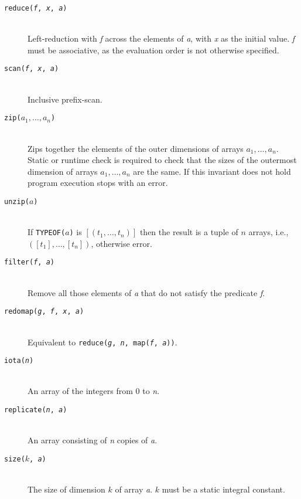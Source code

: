 \documentclass[oneside]{memoir}
\begin{document}
\begin{description}
  \item[\texttt{reduce(\textit{f}, \textit{x}, \textit{a})}]\hfill\\
    Left-reduction with \textit{f} across the elements of \textit{a},
    with \textit{x} as the initial value.  \textit{f} must be
    associative, as the evaluation order is not otherwise specified.

  \item[\texttt{scan(\textit{f}, \textit{x}, \textit{a})}]\hfill\\
    Inclusive prefix-scan.

  \item[\texttt{zip($a_1, \ldots, a_n$)}]\hfill\\
    Zips together the elements of the outer dimensions of arrays $a_1, \ldots, a_n$.
    Static or runtime check is required to check that the sizes of
    the outermost dimension of arrays $a_1, \ldots, a_n$ are the same.
    If this invariant does not hold program execution stops with an error.
  \item[\texttt{unzip($a$)}]\hfill\\
    If \texttt{TYPEOF(}$a$\texttt{)} is $[(t_1, \ldots, t_n)]$ then
    the result is a tuple of $n$ arrays, i.e., $([t_1], \ldots, [t_n])$,
    otherwise error.  
  \item[\texttt{filter(\textit{f}, \textit{a})}]\hfill\\
    Remove all those elements of \textit{a} that do not satisfy the
    predicate \textit{f}.

  \item[\texttt{redomap(\textit{g}, \textit{f}, \textit{x}, \textit{a})}]\hfill\\
    Equivalent to \texttt{reduce(\textit{g}, \textit{n}, map(\textit{f}, \textit{a}))}.

  \item[\texttt{iota(\textit{n})}]\hfill\\
    An array of the integers from $0$ to \textit{n}.

  \item[\texttt{replicate(\textit{n}, \textit{a})}]\hfill\\
    An array consisting of \textit{n} copies of \textit{a}.

  \item[\texttt{size($k$, \textit{a})}]\hfill\\
    The size of dimension $k$ of array \textit{a}.  $k$ must be a
    static integral constant.


\end{description}
\end{document}
